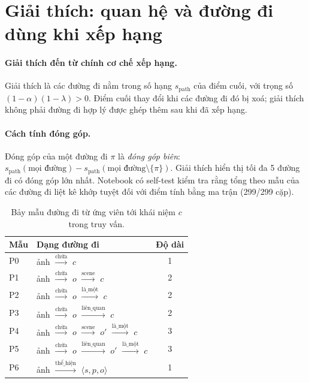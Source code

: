 \documentclass[11pt,a4paper]{article}
\begin{document}
\section{Giải thích: quan hệ và đường đi dùng khi xếp hạng}\label{sec:explain}

\paragraph{Giải thích đến từ chính cơ chế xếp hạng.} Giải thích là các đường đi nằm trong số hạng \(s_{\text{path}}\) của điểm cuối, với trọng số \((1-\alpha)(1-\lambda)>0\). Điểm cuối thay đổi khi các đường đi đó bị xoá; giải thích không phải đường đi hợp lý được ghép thêm sau khi đã xếp hạng.

\paragraph{Cách tính đóng góp.} Đóng góp của một đường đi \(\pi\) là \emph{đóng góp biên}: \(s_{\text{path}}(\text{mọi đường}) - s_{\text{path}}(\text{mọi đường} \setminus \{\pi\})\). Giải thích hiển thị tối đa 5 đường đi có đóng góp lớn nhất. Notebook có self-test kiểm tra rằng tổng theo mẫu của các đường đi liệt kê khớp tuyệt đối với điểm tính bằng ma trận (299/299 cặp).

\begin{table}[H]
\centering\small
\begin{tabular}{llc}
\toprule
\textbf{Mẫu} & \textbf{Dạng đường đi} & \textbf{Độ dài} \\
\midrule
P0 & ảnh \(\xrightarrow{\text{chứa}}\) \(c\) & 1 \\
P1 & ảnh \(\xrightarrow{\text{chứa}}\) \(o\) \(\xrightarrow{\text{scene}}\) \(c\) & 2 \\
P2 & ảnh \(\xrightarrow{\text{chứa}}\) \(o\) \(\xrightarrow{\text{là\_một}}\) \(c\) & 2 \\
P3 & ảnh \(\xrightarrow{\text{chứa}}\) \(o\) \(\xrightarrow{\text{liên\_quan}}\) \(c\) & 2 \\
P4 & ảnh \(\xrightarrow{\text{chứa}}\) \(o\) \(\xrightarrow{\text{scene}}\) \(o'\) \(\xrightarrow{\text{là\_một}}\) \(c\) & 3 \\
P5 & ảnh \(\xrightarrow{\text{chứa}}\) \(o\) \(\xrightarrow{\text{liên\_quan}}\) \(o'\) \(\xrightarrow{\text{là\_một}}\) \(c\) & 3 \\
P6 & ảnh \(\xrightarrow{\text{thể\_hiện}}\) \(\langle s,p,o\rangle\) & 1 \\
\bottomrule
\end{tabular}
\caption{Bảy mẫu đường đi từ ứng viên tới khái niệm \(c\) trong truy vấn.}
\label{tab:patterns}
\end{table}
\end{document}
